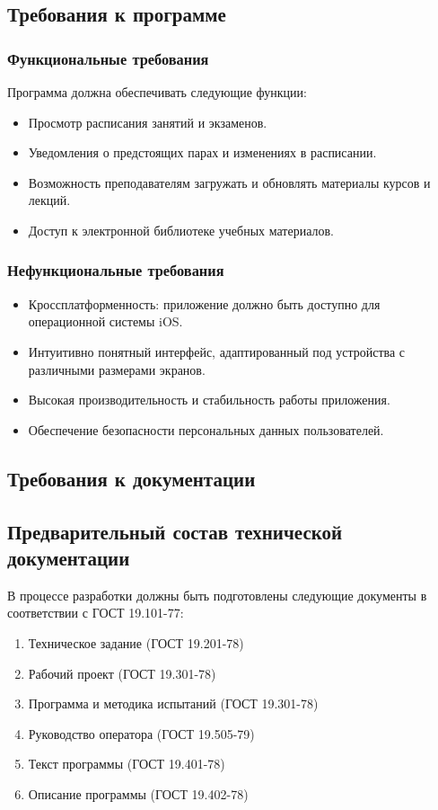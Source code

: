 \documentclass[a4paper,12pt]{article}
\begin{document}
\subsection{Требования к программе}
\subsubsection{Функциональные требования}
Программа должна обеспечивать следующие функции:
\begin{itemize}
  \item Просмотр расписания занятий и экзаменов.
  \item Уведомления о предстоящих парах и изменениях в расписании.
  \item Возможность преподавателям загружать и обновлять материалы курсов и лекций.
  \item Доступ к электронной библиотеке учебных материалов.
\end{itemize}

\subsubsection{Нефункциональные требования}
\begin{itemize}
  \item Кроссплатформенность: приложение должно быть доступно для операционной системы iOS.
  \item Интуитивно понятный интерфейс, адаптированный под устройства с различными размерами экранов.
  \item Высокая производительность и стабильность работы приложения.
  \item Обеспечение безопасности персональных данных пользователей.
\end{itemize}
\subsection{Требования к документации}
\subsection{Предварительный состав технической документации}
В процессе разработки должны быть подготовлены следующие документы в соответствии с ГОСТ 19.101-77:
\begin{enumerate}
  \item Техническое задание (ГОСТ 19.201-78)
  \item Рабочий проект (ГОСТ 19.301-78)
  \item Программа и методика испытаний (ГОСТ 19.301-78)
  \item Руководство оператора (ГОСТ 19.505-79)
  \item Текст программы (ГОСТ 19.401-78)
  \item Описание программы (ГОСТ 19.402-78)
\end{enumerate}
\end{document}
